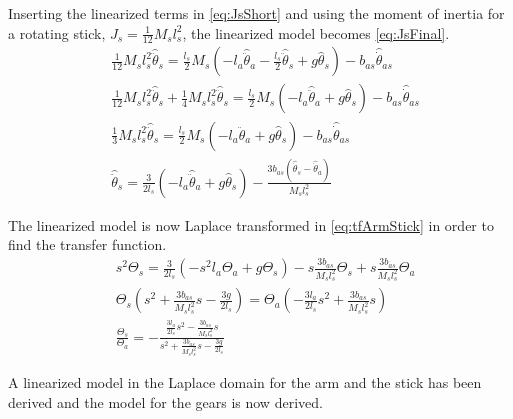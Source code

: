 Inserting the linearized terms in \autoref{eq:JsShort} and using the moment of inertia for a rotating stick, $J_s=\frac{1}{12}M_sl_s^2$, the linearized model becomes \eqref{eq:JsFinal}.
\begin{subequations}
	\begin{flalign}
		& \frac{1}{12}M_sl_s^2\hat{\ddot{\theta}}_s=\frac{l_s}{2}M_s\left(-l_a\hat{\ddot{\theta}}_a-\frac{l_s}{2}\hat{\ddot{\theta}}_s+g\hat{\theta}_s\right)-b_{as}\hat{\dot{\theta}}_{as}   \\
		& \frac{1}{12}M_sl_s^2\hat{\ddot{\theta}}_s+\frac{1}{4}M_sl_s^2\hat{\ddot{\theta}}_s=\frac{l_s}{2}M_s\left(-l_a\hat{\ddot{\theta}}_a+g\hat{\theta}_s\right)-b_{as}\hat{\dot{\theta}}_{as}   \\
		& \frac{1}{3}M_sl_s^2\hat{\ddot{\theta}}_s=\frac{l_s}{2}M_s\left(-l_a\hat{\ddot{\theta}}_a+g\hat{\theta}_s\right)-b_{as}\hat{\dot{\theta}}_{as}  \label{eq:TauSmLin} \\
		& \hat{\ddot{\theta}}_s=\frac{3}{2l_s}\left(-l_a\hat{\ddot{\theta}}_a+g\hat{\theta}_s\right)-\frac{3b_{as}\left(\hat{\dot{\theta}}_s-\hat{\dot{\theta}}_a\right)}{M_sl_s^2} \label{eq:JsFinal}
	\end{flalign}
\end{subequations}

The linearized model is now Laplace transformed in \autoref{eq:tfArmStick} in order to find the transfer function.
\begin{subequations}
	\begin{flalign}
		& s^2\Theta_s=\frac{3}{2l_s}\left(-s^2l_a\Theta_a+g\Theta_s\right)-s\frac{3b_{as}}{M_sl_s^2}\Theta_s+s\frac{3b_{as}}{M_sl_s^2}\Theta_a  \\
		& \Theta_s\left(s^2+\frac{3b_{as}}{M_sl_s^2}s-\frac{3g}{2l_s}\right)=\Theta_a\left(-\frac{3l_a}{2l_s}s^2+\frac{3b_{as}}{M_sl_s^2}s\right)  \\
		& \frac{\Theta_s}{\Theta_a}=-\frac{\frac{3l_a}{2l_s}s^2-\frac{3b_{as}}{M_sl_s^2}s}{s^2+\frac{3b_{as}}{M_sl_s^2}s-\frac{3g}{2l_s}} \label{eq:tfArmStick}
	\end{flalign}
\end{subequations}

A linearized model in the Laplace domain for the arm and the stick has been derived and the model for the gears is now derived.



